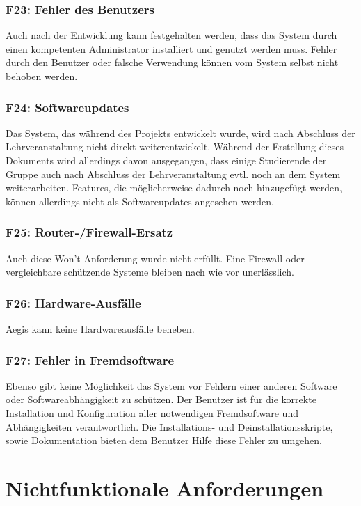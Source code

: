 \documentclass[../review_3.tex]{subfiles}
\begin{document}
\subsubsection{F23: Fehler des Benutzers}
Auch nach der Entwicklung kann festgehalten werden, dass das System durch einen kompetenten Administrator installiert und genutzt werden muss.
Fehler durch den Benutzer oder falsche Verwendung können vom System selbst nicht behoben werden.

\subsubsection{F24: Softwareupdates}
Das System, das während des Projekts entwickelt wurde, wird nach Abschluss der Lehrveranstaltung nicht direkt weiterentwickelt. Während der Erstellung dieses Dokuments wird allerdings davon ausgegangen, dass einige Studierende der Gruppe auch nach Abschluss der Lehrveranstaltung evtl. noch an dem System weiterarbeiten. Features, die möglicherweise dadurch noch hinzugefügt werden, können allerdings nicht als Softwareupdates angesehen werden.

\subsubsection{F25: Router-/Firewall-Ersatz}
Auch diese Won't-Anforderung wurde nicht erfüllt. Eine Firewall oder vergleichbare schützende Systeme bleiben nach wie vor unerlässlich.

\subsubsection{F26: Hardware-Ausfälle}
Aegis kann keine Hardwareausfälle beheben.

\subsubsection{F27: Fehler in Fremdsoftware}
Ebenso gibt keine Möglichkeit das System vor Fehlern einer anderen Software oder Softwareabhängigkeit zu schützen. Der Benutzer ist für die korrekte Installation und Konfiguration aller notwendigen Fremdsoftware und Abhängigkeiten verantwortlich. Die Installations- und Deinstallationsskripte, sowie Dokumentation bieten dem Benutzer Hilfe diese Fehler zu umgehen.


\section{Nichtfunktionale Anforderungen}
\end{document}
